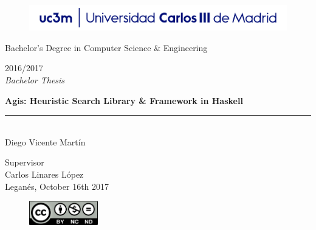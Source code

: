 \documentclass[a4paper,12pt]{article}
\begin{document}

\begin{titlepage}
  \begin{sffamily}
  \color{azulUC3M}
  \begin{center}
    \begin{figure}[htb]
      \begin{center}
        \vspace*{0.6cm}
        \includegraphics[width=15cm]{img/Portada_Logo.png}
        \vspace*{1.6cm}
      \end{center}
    \end{figure}
    
  \begin{Large}
    Bachelor's Degree in Computer Science \& Engineering\\
  \end{Large}
  
  \begin{LARGE}
    2016/2017 \\
    \vspace*{2cm}
    \textsl{Bachelor Thesis}\\
  \end{LARGE}
    
    \begin{huge}
      \textbf{Agis: Heuristic Search Library \& Framework in Haskell} \\
      \rule{80mm}{0.1mm}\\
      \vspace*{1cm}
      Diego Vicente Martín\\
    \end{huge}
    
    \vspace*{1cm}
    \begin{Large}
      Supervisor\\
      Carlos Linares López\\
      Leganés, October 16th 2017\\
    \end{Large}
  \end{center}
  \vspace*{4cm}
  \color{black}

  \begin{figure}
    \vspace{-0.7cm}
    \includegraphics[width=3cm]{img/creativecommons.png}
  \end{figure}



\end{sffamily}
\end{titlepage}
\end{document}
